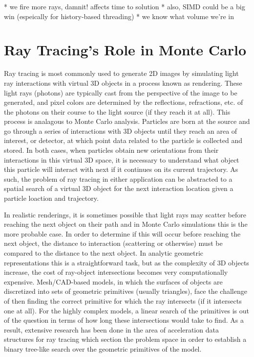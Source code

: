 \documentclass[10pt, a4paper]{article}
\begin{document}
* we fire more rays, damnit! affects time to solution
* also, SIMD could be a big win (espeically for history-based threading)
* we know what volume we're in

\section{Ray Tracing's Role in Monte Carlo}%

Ray tracing is most commonly used to generate 2D images by simulating light ray interactions with virtual 3D objects in a process known as rendering. These light rays (photons) are typically cast from the perspective of the image to be generated, and pixel colors are determined by the reflections, refractions, etc. of the photons on their course to the light source (if they reach it at all). This process is analagous to Monte Carlo analysis. Particles are born at the source and go through a series of interactions with 3D objects until they reach an area of interest, or detector, at which point data related to the particle is collected and stored. In both cases, when particles obtain new orientations from their interactions in this virtual 3D space, it is necessary to understand what object this particle will interact with next if it continues on its current trajectory. As such, the problem of ray tracing in either application can be abstracted to a spatial search of a virtual 3D object for the next interaction location given a particle loaction and trajectory. 

In realistic renderings, it is sometimes possible that light rays may scatter before reaching the next object on their path and in Monte Carlo simulations this is the more probable case. In order to determine if this will occur before reaching the next object, the distance to interaction (scattering or otherwise) must be compared to the distance to the next object. In analytic geometric representations this is a straightforward task, but as the complexity of 3D objects increase, the cost of ray-object intersections becomes very computationally expensive. Mesh/CAD-based models, in which the surfaces of objects are discretized into sets of geometric primitives (usually triangles), face the challenge of then finding the correct primitive for which the ray intersects (if it intersects one at all). For the highly complex models, a linear search of the primitives is out of the question in terms of how long these intersections would take to find. As a result, extensive research has been done in the area of acceleration data structures for ray tracing which section the problem space in order to establish a binary tree-like search over the geometric primitives of the model.
\end{document}
